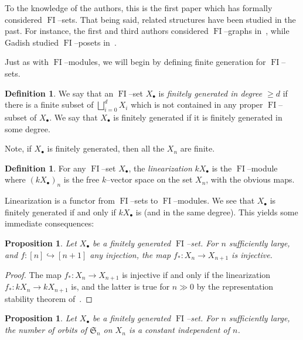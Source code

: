 \documentclass[10pt]{amsart}
\DeclareMathOperator{\FI}{FI}
\newcommand{\Sn}{\mathfrak{S}}
\newcommand{\dt}{\bullet}
\newtheorem{prop}[theorem]{Proposition}
\theoremstyle{definition}
\newtheorem{definition}[theorem]{Definition}
\begin{document}
To the knowledge of the authors, this is the first paper which has formally considered $\FI$--sets. That being said, related structures have been studied in the past. For instance, the first and third authors considered $\FI$--graphs in~\cite{RW}, while Gadish studied $\FI$--posets in~\cite{G}.

Just as with $\FI$--modules, we will begin by defining finite generation for $\FI$--sets.

\begin{definition}\label{fgset}
We say that an $\FI$--set $X_{\dt}$ is \emph{finitely generated in degree $\geq d$} if there is a finite subset of $\bigsqcup_{i=0}^d X_i$ which is not contained in any proper $\FI$--subset of $X_{\dt}$. 
We say that $X_{\dt}$ is finitely generated if it is finitely generated in some degree.
\end{definition}
 Note, if $X_{\dt}$ is finitely generated, then all the $X_n$ are finite. 


\begin{definition}
For any $\FI$--set $X_{\dt}$, the \emph{linearization} $k X_{\dt}$ is the $\FI$--module where $(kX_{\dt})_n$ is the free $k$--vector space on the set $X_n$, with the obvious maps. 
\end{definition}

Linearization is a functor from $\FI$--sets to $\FI$--modules.
We see that $X_\dt$ is finitely generated if and only if $k X_\dt$ is (and in the same degree). This yields some immediate consequences:


\begin{prop} \label{elementstab}
Let $X_\dt$ be a finitely generated $\FI$--set. For $n$ sufficiently large, and $f:[n] \hookrightarrow [n+1]$ any injection, the map $f_{\ast}: X_n \to X_{n+1}$ is injective.
\end{prop}


\begin{proof}
The map $f_{\ast}: X_n \to X_{n+1}$ is injective if and only if the linearization $f_{\ast}: kX_n \to kX_{n+1}$ is, and the latter is true for $n \gg 0$ by the representation stability theorem of~\cite[Theorem~1.13]{CEF}.
\end{proof}

\begin{prop} \label{numberorbitsstab}
Let $X_\dt$ be a finitely generated $\FI$--set. For $n$ sufficiently large, the number of orbits of $\Sn_n$ on $X_n$ is a constant independent of $n$. 
\end{prop}
\end{document}
